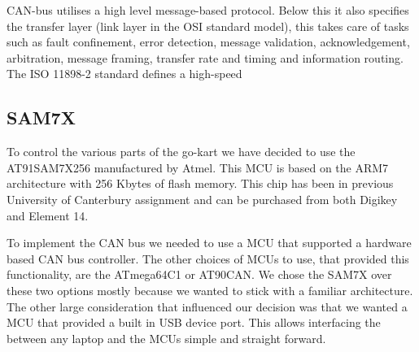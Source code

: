CAN-bus utilises a high level message-based protocol.  Below this it also
specifies the transfer layer (link layer in the OSI standard model), this takes
care of tasks such as fault confinement, error detection, message validation,
acknowledgement, arbitration, message framing, transfer rate and timing and
information routing.  The ISO 11898-2 standard defines a high-speed 

\subsection{SAM7X}
To control the various parts of the go-kart we have decided to use the
AT91SAM7X256\cite{SAM7Xdatasheet} manufactured by Atmel. This MCU is
based on the ARM7 architecture with 256 Kbytes of flash memory. This chip has
been in previous University of Canterbury assignment and can be purchased from
both Digikey and Element 14.

To implement the CAN bus we needed to use a MCU that supported a hardware based
CAN bus controller. The other choices of MCUs to use, that provided this
functionality, are the ATmega64C1 or AT90CAN. We chose the SAM7X over these two
options mostly because we wanted to stick with a familiar architecture. The
other large consideration that influenced our decision was that we wanted a MCU
that provided a built in USB device port. This allows interfacing the between
any laptop and the MCUs simple and straight forward.

